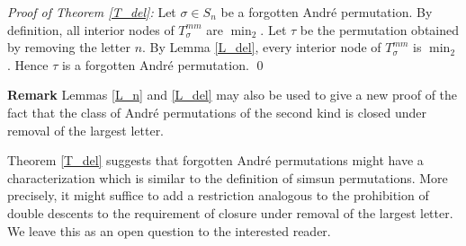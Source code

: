 {\em\noindent Proof of Theorem \ref{T_del}:}
Let $\sigma\in S_n$ be a forgotten Andr\'e permutation. By definition,
all interior nodes of $T_{\sigma}^{mm}$ are $\min_2$. Let $\tau$ be the
permutation obtained by removing the letter $n$. By Lemma \ref{L_del},
every interior node of $T_{\sigma}^{mm}$ is $\min_2$. Hence $\tau$ is a
forgotten Andr\'e permutation. \qed

{\bf\noindent Remark} Lemmas \ref{L_n} and \ref{L_del} may also be used
to give a new proof of the fact that the class of Andr\'e permutations
of the second kind is closed under removal of the largest letter.

Theorem \ref{T_del} suggests that forgotten Andr\'e permutations might
have a characterization which is similar to the definition of simsun
permutations. More precisely, it might suffice to add a restriction analogous to
the prohibition of double descents to the requirement of closure under
removal of the largest letter. We leave this as an open question to the
interested reader.  

